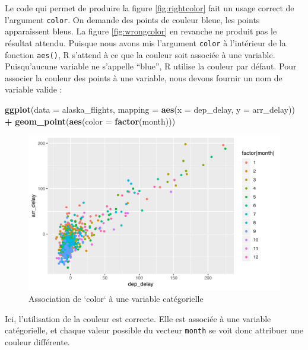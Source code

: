 \documentclass[a4paperpaper,]{article}
\newenvironment{Shaded}{\begin{snugshade}}{\end{snugshade}}
\newcommand{\KeywordTok}[1]{\textcolor[rgb]{0.13,0.29,0.53}{\textbf{#1}}}
\newcommand{\DataTypeTok}[1]{\textcolor[rgb]{0.13,0.29,0.53}{#1}}
\newcommand{\StringTok}[1]{\textcolor[rgb]{0.31,0.60,0.02}{#1}}
\newcommand{\OperatorTok}[1]{\textcolor[rgb]{0.81,0.36,0.00}{\textbf{#1}}}
\newcommand{\NormalTok}[1]{#1}
\theoremstyle{definition}
\theoremstyle{definition}
\theoremstyle{definition}
\theoremstyle{remark}
\begin{document}
Le code qui permet de produire la figure \ref{fig:rightcolor} fait un
usage correct de l'argument \texttt{color}. On demande des points de
couleur bleue, les points apparaîssent bleus. La figure
\ref{fig:wrongcolor} en revanche ne produit pas le résultat attendu.
Puisque nous avons mis l'argument \texttt{color} à l'intérieur de la
fonction \texttt{aes()}, R s'attend à ce que la couleur soit associée à
une variable. Puisqu'aucune variable ne s'appelle ``blue'', R utilise la
couleur par défaut. Pour associer la couleur des points à une variable,
nous devons fournir un nom de variable valide :

\begin{Shaded}
\begin{Highlighting}[]
\KeywordTok{ggplot}\NormalTok{(}\DataTypeTok{data =}\NormalTok{ alaska_flights, }\DataTypeTok{mapping =} \KeywordTok{aes}\NormalTok{(}\DataTypeTok{x =}\NormalTok{ dep_delay, }\DataTypeTok{y =}\NormalTok{ arr_delay)) }\OperatorTok{+}
\StringTok{  }\KeywordTok{geom_point}\NormalTok{(}\KeywordTok{aes}\NormalTok{(}\DataTypeTok{color =} \KeywordTok{factor}\NormalTok{(month)))}
\end{Highlighting}
\end{Shaded}

\begin{figure}[htpb]

{\centering \includegraphics[width=0.9\linewidth]{figure/varcolor-1} 

}

\caption{Association de `color` à une variable catégorielle}\label{fig:varcolor}
\end{figure}

Ici, l'utilisation de la couleur est correcte. Elle est associée à une
variable catégorielle, et chaque valeur possible du vecteur
\texttt{month} se voit donc attribuer une couleur différente.
\end{document}
